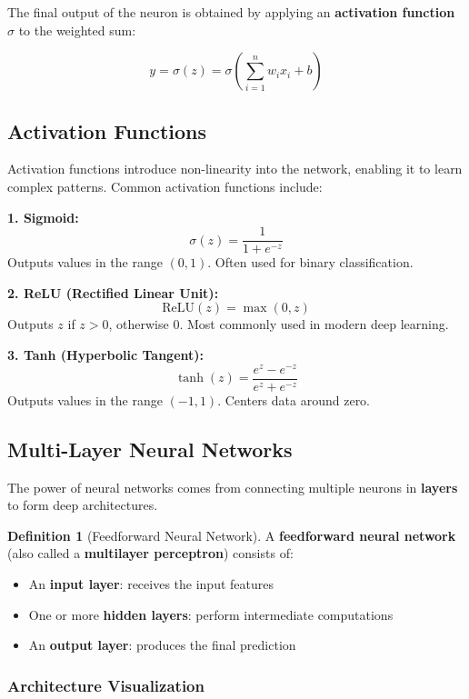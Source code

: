 \documentclass[11pt,a4paper]{article}
\theoremstyle{definition}
\newtheorem{definition}{Definition}[section]
\theoremstyle{plain}
\theoremstyle{remark}
\begin{document}
The final output of the neuron is obtained by applying an \textbf{activation function} $\sigma$ to the weighted sum:

\[
y = \sigma(z) = \sigma\left(\sum_{i=1}^{n} w_i x_i + b\right)
\]

\subsection{Activation Functions}

Activation functions introduce non-linearity into the network, enabling it to learn complex patterns. Common activation functions include:

\begin{tcolorbox}[colback=green!5!white,colframe=green!75!black,title=\textbf{Common Activation Functions}]
\textbf{1. Sigmoid:}
\[
\sigma(z) = \frac{1}{1 + e^{-z}}
\]
Outputs values in the range $(0, 1)$. Often used for binary classification.

\textbf{2. ReLU (Rectified Linear Unit):}
\[
\text{ReLU}(z) = \max(0, z)
\]
Outputs $z$ if $z > 0$, otherwise $0$. Most commonly used in modern deep learning.

\textbf{3. Tanh (Hyperbolic Tangent):}
\[
\tanh(z) = \frac{e^z - e^{-z}}{e^z + e^{-z}}
\]
Outputs values in the range $(-1, 1)$. Centers data around zero.
\end{tcolorbox}

\subsection{Multi-Layer Neural Networks}

The power of neural networks comes from connecting multiple neurons in \textbf{layers} to form deep architectures.

\begin{definition}[Feedforward Neural Network]
A \textbf{feedforward neural network} (also called a \textbf{multilayer perceptron}) consists of:
\begin{itemize}
    \item An \textbf{input layer}: receives the input features
    \item One or more \textbf{hidden layers}: perform intermediate computations
    \item An \textbf{output layer}: produces the final prediction
\end{itemize}
\end{definition}

\subsubsection{Architecture Visualization}
\end{document}
